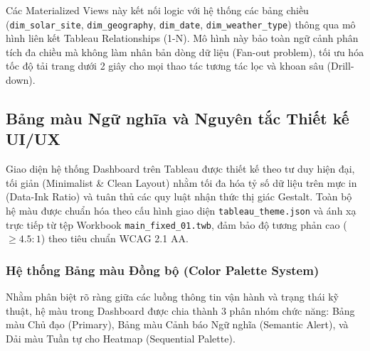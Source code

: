 \documentclass[12pt, a4paper]{report}
\begin{document}
Các Materialized Views này kết nối logic với hệ thống các bảng chiều (\texttt{dim\_solar\_site}, \texttt{dim\_geography}, \texttt{dim\_date}, \texttt{dim\_weather\_type}) thông qua mô hình liên kết Tableau Relationships (1-N). Mô hình này bảo toàn ngữ cảnh phân tích đa chiều mà không làm nhân bản dòng dữ liệu (Fan-out problem), tối ưu hóa tốc độ tải trang dưới 2 giây cho mọi thao tác tương tác lọc và khoan sâu (Drill-down).

\subsection{Bảng màu Ngữ nghĩa và Nguyên tắc Thiết kế UI/UX}
\label{subsec:color_palette}

Giao diện hệ thống Dashboard trên Tableau được thiết kế theo tư duy hiện đại, tối giản (Minimalist \& Clean Layout) nhằm tối đa hóa tỷ số dữ liệu trên mực in (Data-Ink Ratio) và tuân thủ các quy luật nhận thức thị giác Gestalt. Toàn bộ hệ màu được chuẩn hóa theo cấu hình giao diện \texttt{tableau\_theme.json} và ánh xạ trực tiếp từ tệp Workbook \texttt{main\_fixed\_01.twb}, đảm bảo độ tương phản cao ($\ge 4.5:1$) theo tiêu chuẩn WCAG 2.1 AA.

\subsubsection{Hệ thống Bảng màu Đồng bộ (Color Palette System)}

Nhằm phân biệt rõ ràng giữa các luồng thông tin vận hành và trạng thái kỹ thuật, hệ màu trong Dashboard được chia thành 3 phân nhóm chức năng: Bảng màu Chủ đạo (Primary), Bảng màu Cảnh báo Ngữ nghĩa (Semantic Alert), và Dải màu Tuần tự cho Heatmap (Sequential Palette).
\end{document}
